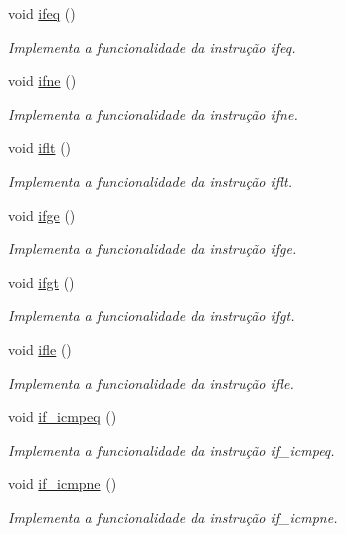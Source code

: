 \begin{DoxyCompactItemize}
void \hyperlink{classOperations_ad33c8bdb5f67bdbf0885bb51990f99ee}{ifeq} ()
\begin{DoxyCompactList}\small\item\em Implementa a funcionalidade da instrução ifeq. \end{DoxyCompactList}\item 
void \hyperlink{classOperations_aaadc2a6aaf1d3be06e918930622dad29}{ifne} ()
\begin{DoxyCompactList}\small\item\em Implementa a funcionalidade da instrução ifne. \end{DoxyCompactList}\item 
void \hyperlink{classOperations_a0a9460ea938fc3a9bbd2102578d50ee2}{iflt} ()
\begin{DoxyCompactList}\small\item\em Implementa a funcionalidade da instrução iflt. \end{DoxyCompactList}\item 
void \hyperlink{classOperations_a0e7cf2111ad25ee52aa329cc6ec4d38a}{ifge} ()
\begin{DoxyCompactList}\small\item\em Implementa a funcionalidade da instrução ifge. \end{DoxyCompactList}\item 
void \hyperlink{classOperations_afff52b972f58750ea8037aeb02dd22bc}{ifgt} ()
\begin{DoxyCompactList}\small\item\em Implementa a funcionalidade da instrução ifgt. \end{DoxyCompactList}\item 
void \hyperlink{classOperations_a1ef1754372db2e5285a129389274dcc8}{ifle} ()
\begin{DoxyCompactList}\small\item\em Implementa a funcionalidade da instrução ifle. \end{DoxyCompactList}\item 
void \hyperlink{classOperations_a43a49ccd4f1160c0b1968af4296fa2b3}{if\+\_\+icmpeq} ()
\begin{DoxyCompactList}\small\item\em Implementa a funcionalidade da instrução if\+\_\+icmpeq. \end{DoxyCompactList}\item 
void \hyperlink{classOperations_a52dca630766e37bbaf0e7439c0335273}{if\+\_\+icmpne} ()
\begin{DoxyCompactList}\small\item\em Implementa a funcionalidade da instrução if\+\_\+icmpne. \end{DoxyCompactList}\item 

\end{DoxyCompactItemize}
